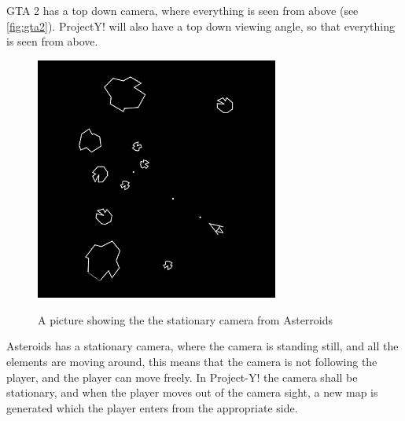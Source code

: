 \documentclass[../main.tex]{subfiles}
\begin{document}
GTA 2 has a top down camera, where everything is seen from above (see \autoref{fig:gta2}). ProjectY! will also have a top down viewing angle, so that everything is seen from above.\\
\begin{figure}[H]
	\centering
	\caption{A picture showing the the stationary camera from Asterroids}
\includegraphics[width=8cm]{images/asteroids}
	\label{fig:ast}
\end{figure}
Asteroids has a stationary camera, where the camera is standing still, and all the elements are moving around, this means that the camera is not following the player, and the player can move freely. In Project-Y! the camera shall be stationary, and when the player moves out of the camera sight, a new map is generated which the player enters from the appropriate side.
\end{document}
